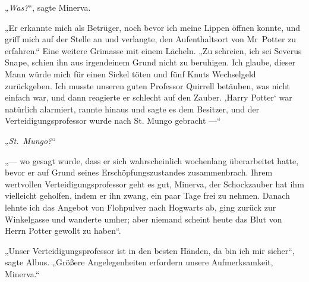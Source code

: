„\emph{Was?}“, sagte Minerva.

„Er erkannte mich als Betrüger, noch bevor ich meine Lippen öffnen konnte, und griff mich auf der Stelle an und verlangte, den Aufenthaltsort von Mr~Potter zu erfahren.“ Eine weitere Grimasse mit einem Lächeln.
„Zu schreien, ich sei Severus Snape, schien ihn aus irgendeinem Grund nicht zu beruhigen. Ich glaube, dieser Mann würde mich für einen Sickel töten und fünf Knuts Wechselgeld zurückgeben. Ich musste unseren guten Professor Quirrell betäuben, was nicht einfach war, und dann reagierte er schlecht auf den Zauber. ‚Harry Potter‘ war natürlich alarmiert, rannte hinaus und sagte es dem Besitzer, und der Verteidigungsprofessor wurde nach St. Mungo gebracht —“

„\emph{St.~Mungo?}“

„— wo gesagt wurde, dass er sich wahrscheinlich wochenlang überarbeitet hatte, bevor er auf Grund seines Erschöpfungszustandes zusammenbrach. Ihrem wertvollen Verteidigungsprofessor geht es gut, Minerva, der Schockzauber hat ihm vielleicht geholfen, indem er ihn zwang, ein paar Tage frei zu nehmen. Danach lehnte ich das Angebot von Flohpulver nach Hogwarts ab, ging zurück zur Winkelgasse und wanderte umher; aber niemand scheint heute das Blut von Herrn Potter gewollt zu haben“.

„Unser Verteidigungsprofessor ist in den besten Händen, da bin ich mir sicher“, sagte Albus.
„Größere Angelegenheiten erfordern unsere Aufmerksamkeit, Minerva.“


